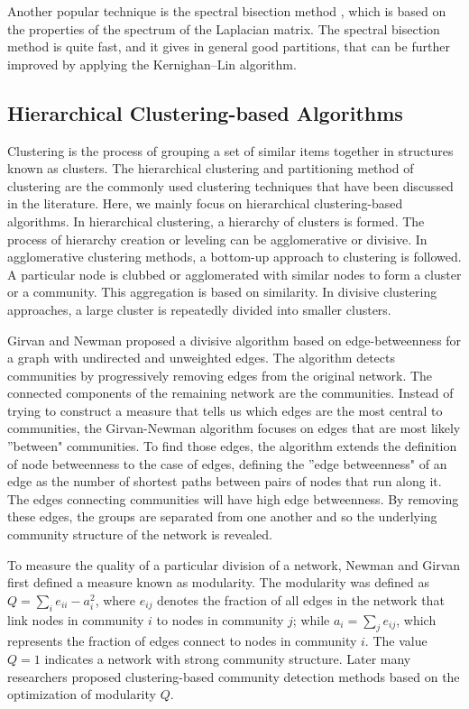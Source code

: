 \documentclass[\main/thesis.tex]{subfiles}
\begin{document}
Another popular technique is the spectral bisection method \cite{barnes1982algorithm}, which is based on the properties of the spectrum of the Laplacian matrix. The spectral bisection method is quite fast, and it gives in general good partitions, that can be further improved by applying the Kernighan–Lin algorithm.

\subsection{Hierarchical Clustering-based Algorithms}
Clustering is the process of grouping a set of similar items together in structures known as clusters. The hierarchical clustering and partitioning method of clustering are the commonly used clustering techniques that have been discussed in the literature. Here, we mainly focus on hierarchical clustering-based algorithms. In hierarchical clustering, a hierarchy of clusters is formed. The process of hierarchy creation or leveling can be agglomerative or divisive. In agglomerative clustering methods, a bottom-up approach to clustering is followed. A particular node is clubbed or agglomerated with similar nodes to form a cluster or a community. This aggregation is based on similarity. In divisive clustering approaches, a large cluster is repeatedly divided into smaller clusters.

Girvan and Newman \cite{girvan2002community} proposed a divisive algorithm based on edge-betweenness for a graph with undirected and unweighted edges. The algorithm detects communities by progressively removing edges from the original network. The connected components of the remaining network are the communities. Instead of trying to construct a measure that tells us which edges are the most central to communities, the Girvan-Newman algorithm focuses on edges that are most likely ''between" communities. To find those edges, the algorithm extends the definition of node betweenness to the case of edges, defining the ''edge betweenness" of an edge as the number of shortest paths between pairs of nodes that run along it. The edges connecting communities will have high edge betweenness. By removing these edges, the groups are separated from one another and so the underlying community structure of the network is revealed.

To measure the quality of a particular division of a network, Newman and Girvan \cite{newman2004finding} first defined a measure known as modularity. The modularity was defined as $Q=\sum_ie_{ii}-a_i^2$, where $e_{ij}$ denotes the fraction of all edges in the network that link nodes in community $i$ to nodes in community $j$; while $a_i=\sum_je_{ij}$, which represents the fraction of edges connect to nodes in community $i$. The value $Q = 1$ indicates a network with strong community structure. Later many researchers proposed clustering-based community detection methods based on the optimization of modularity $Q$.
\end{document}
